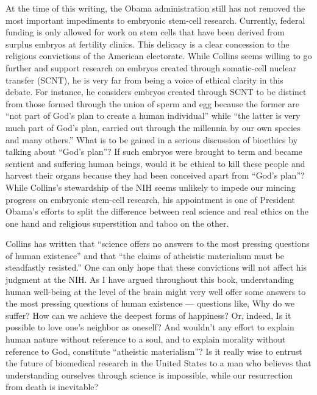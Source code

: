 \documentclass[a4paper,14pt]{extarticle}
\begin{document}
At the time of this writing, the Obama administration still has not removed the most important impediments to embryonic stem-cell research.
Currently, federal funding is only allowed for work on stem cells that have been derived from surplus embryos at fertility clinics.
This delicacy is a clear concession to the religious convictions of the American electorate.
While Collins seems willing to go further and support research on embryos created through somatic-cell nuclear transfer (SCNT), he is very far from being a voice of ethical clarity in this debate.
For instance, he considers embryos created through SCNT to be distinct from those formed through the union of sperm and egg because the former are ``not part of God’s plan to create a human individual'' while ``the latter is very much part of God’s plan, carried out through the millennia by our own species and many others.''
What is to be gained in a serious discussion of bioethics by talking about ``God’s plan''?
If such embryos were brought to term and became sentient and suffering human beings, would it be ethical to kill these people and harvest their organs because they had been conceived apart from ``God’s plan''?
While Collins’s stewardship of the NIH seems unlikely to impede our mincing progress on embryonic stem-cell research, his appointment is one of President Obama’s efforts to split the difference between real science and real ethics on the one hand and religious superstition and taboo on the other.

Collins has written that ``science offers no answers to the most pressing questions of human existence'' and that ``the claims of atheistic materialism must be steadfastly resisted.''
One can only hope that these convictions will not affect his judgment at the NIH.
As I have argued throughout this book, understanding human well-being at the level of the brain might very well offer some answers to the most pressing questions of human existence --- questions like, Why do we suffer?
How can we achieve the deepest forms of happiness?
Or, indeed, Is it possible to love one’s neighbor as oneself?
And wouldn’t any effort to explain human nature without reference to a soul, and to explain morality without reference to God, constitute ``atheistic materialism''?
Is it really wise to entrust the future of biomedical research in the United States to a man who believes that understanding ourselves through science is impossible, while our resurrection from death is inevitable?
\end{document}
